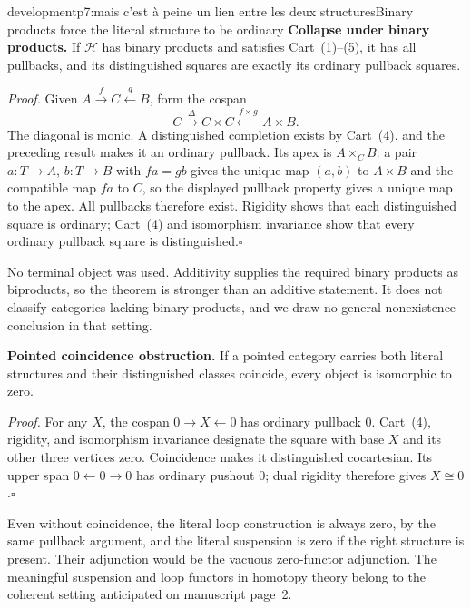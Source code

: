 \begin{dcomment}{development}{p7:mais c'est à peine un lien entre les deux structures}{Binary products force the literal structure to be ordinary}
\textbf{Collapse under binary products.}\ours\quad
If $\mathcal H$ has binary products and satisfies Cart~(1)--(5), it has all pullbacks, and its distinguished squares are exactly its ordinary pullback squares.

\emph{Proof.} Given $A\xrightarrow fC\xleftarrow gB$, form the cospan
\[
C\xrightarrow{\Delta}C\times C
  \xleftarrow{\,f\times g\,}A\times B.
\]
The diagonal is monic. A distinguished completion exists by Cart~(4), and the preceding result makes it an ordinary pullback. Its apex is $A\times_CB$: a pair $a:T\to A$, $b:T\to B$ with $fa=gb$ gives the unique map $(a,b)$ to $A\times B$ and the compatible map $fa$ to $C$, so the displayed pullback property gives a unique map to the apex. All pullbacks therefore exist. Rigidity shows that each distinguished square is ordinary; Cart~(4) and isomorphism invariance show that every ordinary pullback square is distinguished.\hfill$\square$

No terminal object was used. Additivity supplies the required binary products as biproducts, so the theorem is stronger than an additive statement. It does not classify categories lacking binary products, and we draw no general nonexistence conclusion in that setting.

\textbf{Pointed coincidence obstruction.}\ours\quad
If a pointed category carries both literal structures and their distinguished classes coincide, every object is isomorphic to zero.

\emph{Proof.} For any $X$, the cospan $0\to X\leftarrow0$ has ordinary pullback $0$. Cart~(4), rigidity, and isomorphism invariance designate the square with base $X$ and its other three vertices zero. Coincidence makes it distinguished cocartesian. Its upper span $0\leftarrow0\to0$ has ordinary pushout $0$; dual rigidity therefore gives $X\cong0$.\hfill$\square$

Even without coincidence, the literal loop construction is always zero, by the same pullback argument, and the literal suspension is zero if the right structure is present. Their adjunction would be the vacuous zero-functor adjunction. The meaningful suspension and loop functors in homotopy theory belong to the coherent setting anticipated on manuscript page~2.
\end{dcomment}

